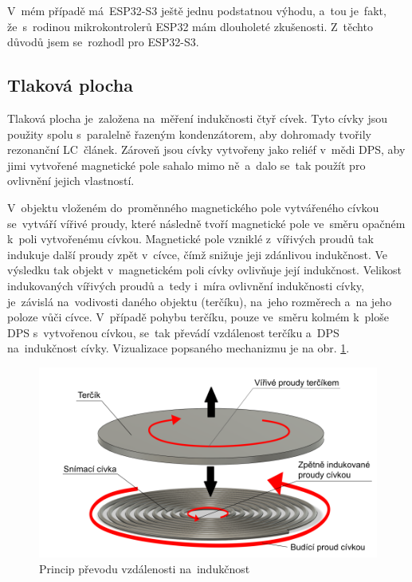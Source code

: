 V~mém případě má~ESP32-S3 ještě jednu podstatnou výhodu, a~tou je~fakt, že~s~rodinou mikrokontrolerů ESP32 mám dlouholeté zkušenosti.
Z~těchto důvodů jsem se~rozhodl pro ESP32-S3.

\subsection{Tlaková plocha \label{popisTlakovky2}}
Tlaková plocha je~založena na~měření indukčnosti čtyř cívek.
Tyto cívky jsou použity spolu s~paralelně řazeným kondenzátorem, aby dohromady tvořily rezonanční LC~článek.
Zároveň jsou cívky vytvořeny jako reliéf v~mědi DPS, aby jimi vytvořené magnetické pole sahalo mimo ně~a~dalo se~tak použít pro ovlivnění jejich vlastností.

V~objektu vloženém do~proměnného magnetického pole vytvářeného cívkou se~vytváří vířivé proudy, které následně tvoří magnetické pole ve~směru opačném k~poli vytvořenému cívkou.
Magnetické pole vzniklé z~vířivých proudů tak indukuje další proudy zpět v~cívce, čímž snižuje jeji zdánlivou indukčnost.
Ve výsledku tak objekt v~magnetickém poli cívky ovlivňuje její indukčnost.
Velikost indukovaných vířivých proudů a~tedy i~míra ovlivnění indukčnosti cívky, je~závislá na~vodivosti daného objektu (terčíku), na~jeho rozměrech a~na jeho poloze vůči cívce.
V~případě pohybu terčíku, pouze ve~směru kolmém k~ploše DPS s~vytvořenou cívkou, se~tak převádí vzdálenost terčíku a~DPS na~indukčnost cívky.
Vizualizace popsaného mechanizmu je na obr. \ref{fig:pryncip-LDC}.

\begin{figure}[h!]
    \centering
    \includegraphics[width=\textwidth]{text/PraktickaCast/img/civka_tercik_ilustrace.png}
    \caption{Princip převodu vzdálenosti na~indukčnost}
    \label{fig:pryncip-LDC}
\end{figure}

